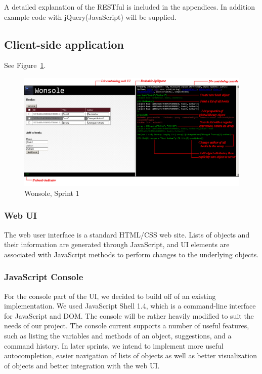 A detailed explanation of the RESTful is included in the appendices. In addition example code with jQuery(JavaScript) will be supplied.

\subsection{Client-side application}

See Figure~\ref{figure:Wonsole-Sprint1}.

\begin{figure}
\centering
\includegraphics[width=6in]{image/Wonsole-Sprint1.png}
\caption{Wonsole, Sprint 1}
\label{figure:Wonsole-Sprint1}
\end{figure}

\subsubsection{Web UI}
The web user interface is a standard HTML/CSS web site. Lists of objects and their information are generated through JavaScript, and UI elements are associated with JavaScript methods to perform changes to the underlying objects.

\subsubsection{JavaScript Console}
For the console part of the UI, we decided to build off of an existing implementation. We used JavaScript Shell 1.4, which is a command-line interface for JavaScript and DOM. The console will be rather heavily modified to suit the needs of our project. The console current supports a number of useful features, such as listing the variables and methods of an object, suggestions, and a command history. In later sprints, we intend to implement more useful autocompletion, easier navigation of lists of objects as well as better visualization of objects and better integration with the web UI.

